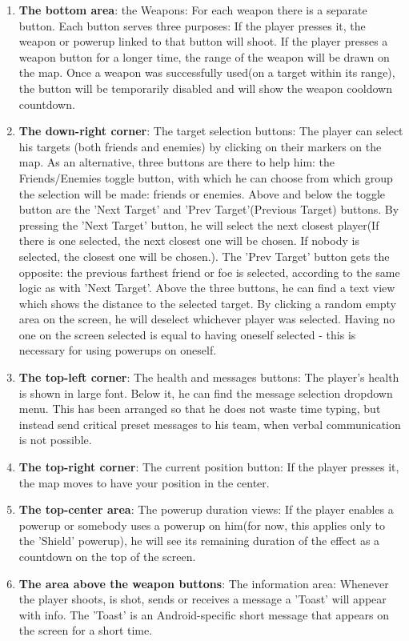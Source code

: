 \begin{enumerate}
  \item \textbf{The bottom area}: the Weapons: For each weapon there is a
  separate button. Each button serves three purposes: If the player presses it,
  the weapon or powerup linked to that button will shoot. If the player presses
  a weapon button for a longer time, the range of the weapon will be drawn on
  the map. Once a weapon was successfully used(on a target within its range),
  the button will be temporarily disabled and will show the weapon cooldown
  countdown.
  
  \item \textbf{The down-right corner}: The target selection buttons: The player
  can select his targets (both friends and enemies) by clicking on their
  markers on the map. As an alternative, three buttons are there to help him:
  the Friends/Enemies toggle button, with which he can choose from which
  group the selection will be made: friends or enemies. Above and below the
  toggle button are the 'Next Target' and 'Prev Target'(Previous Target)
  buttons. By pressing the 'Next Target' button, he will select the next closest
  player(If there is one selected, the next closest one will be chosen. If
  nobody is selected, the closest one will be chosen.). The 'Prev Target' button
  gets the opposite: the previous farthest friend or foe is selected, according
  to the same logic as with 'Next Target'. Above the three buttons, he can find
  a text view which shows the distance to the selected target. By clicking a
  random empty area on the screen, he will deselect whichever player was
  selected. Having no one on the screen selected is equal to having oneself
  selected - this is necessary for using powerups on oneself.
  
  \item \textbf{The top-left corner}: The health and messages buttons: The
  player's health is shown in large font. Below it, he can find the message
  selection dropdown menu. This has been arranged so that he does not waste time
  typing, but instead send critical preset messages to his team, when verbal
  communication is not possible.
  
  \item \textbf{The top-right corner}: The current position button: If the
  player presses it, the map moves to have your position in the center.
  
  \item \textbf{The top-center area}: The powerup duration views: If the player
  enables a powerup or somebody uses a powerup on him(for now, this applies only
  to the 'Shield' powerup), he will see its remaining duration of the effect
  as a countdown on the top of the screen.
  
  \item \textbf{The area above the weapon buttons}: The information area:
  Whenever the player shoots, is shot, sends or receives a message a 'Toast'
  will appear with info. The 'Toast' is an Android-specific short message that
  appears on the screen for a short time.
  
\end{enumerate}


